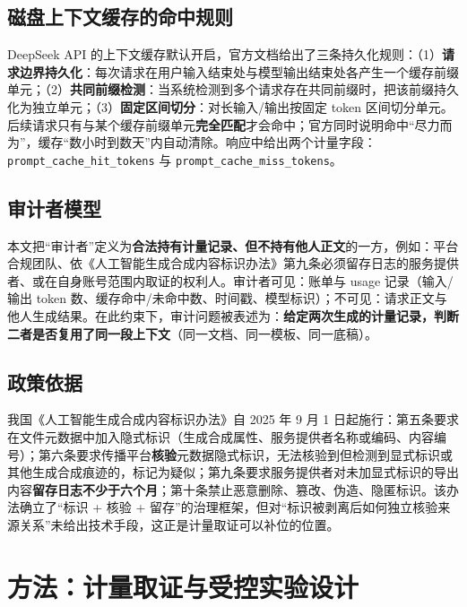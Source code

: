 \documentclass[11pt, a4paper]{ctexart}
\begin{document}
\subsection{磁盘上下文缓存的命中规则}
DeepSeek API 的上下文缓存默认开启，官方文档给出了三条持久化规则\cite{deepseekcache}：（1）\textbf{请求边界持久化}：每次请求在用户输入结束处与模型输出结束处各产生一个缓存前缀单元；（2）\textbf{共同前缀检测}：当系统检测到多个请求存在共同前缀时，把该前缀持久化为独立单元；（3）\textbf{固定区间切分}：对长输入/输出按固定 token 区间切分单元。后续请求只有与某个缓存前缀单元\textbf{完全匹配}才会命中；官方同时说明命中“尽力而为”，缓存“数小时到数天”内自动清除。响应中给出两个计量字段：\texttt{prompt\_cache\_hit\_tokens} 与 \texttt{prompt\_cache\_miss\_tokens}。

\subsection{审计者模型}
本文把“审计者”定义为\textbf{合法持有计量记录、但不持有他人正文}的一方，例如：平台合规团队、依《人工智能生成合成内容标识办法》第九条必须留存日志的服务提供者、或在自身账号范围内取证的权利人。审计者可见：账单与 usage 记录（输入/输出 token 数、缓存命中/未命中数、时间戳、模型标识）；不可见：请求正文与他人生成结果。在此约束下，审计问题被表述为：\textbf{给定两次生成的计量记录，判断二者是否复用了同一段上下文}（同一文档、同一模板、同一底稿）。

\subsection{政策依据}
我国《人工智能生成合成内容标识办法》\cite{cac2025labeling}自 2025 年 9 月 1 日起施行：第五条要求在文件元数据中加入隐式标识（生成合成属性、服务提供者名称或编码、内容编号）；第六条要求传播平台\textbf{核验}元数据隐式标识，无法核验到但检测到显式标识或其他生成合成痕迹的，标记为疑似；第九条要求服务提供者对未加显式标识的导出内容\textbf{留存日志不少于六个月}；第十条禁止恶意删除、篡改、伪造、隐匿标识。该办法确立了“标识 + 核验 + 留存”的治理框架，但对“标识被剥离后如何独立核验来源关系”未给出技术手段，这正是计量取证可以补位的位置。

\section{方法：计量取证与受控实验设计}
\label{sec:method}
\end{document}
